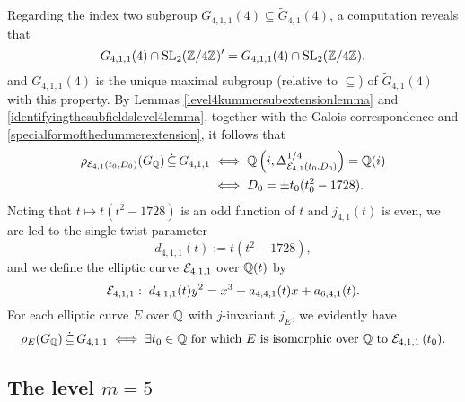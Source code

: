Regarding the index two subgroup $G_{4,1,1}(4) \subseteq \tilde{G}_{4,1}(4)$, a computation reveals that
\[
G_{4,1,1}(4) \cap \operatorname{SL}_2(\mathbb{Z}/4\mathbb{Z})' = G_{4,1,1}(4) \cap \operatorname{SL}_2(\mathbb{Z}/4\mathbb{Z}),
\]
and $G_{4,1,1}(4)$ is the unique maximal subgroup (relative to $\dot\subseteq$) of $\tilde{G}_{4,1}(4)$ with this property. By Lemmas \ref{level4kummersubextensionlemma} and \ref{identifyingthesubfieldslevel4lemma}, together with the Galois correspondence and \eqref{specialformofthedummerextension}, it follows that
\begin{equation} \label{howtogetsmallermod4image}
\begin{split}
\rho_{\mathcal{E}_{4,1}(t_0,D_0)}(G_{\mathbb{Q}}) \, \dot\subseteq \, G_{4,1,1} \; &\Longleftrightarrow \; \mathbb{Q}\left( i,\Delta_{\mathcal{E}_{4,1}(t_0,D_0)}^{1/4} \right) = \mathbb{Q}(i) \\
&\Longleftrightarrow \; D_0 = \pm t_0(t_0^2 - 1728).
\end{split}
\end{equation}
Noting that $t \mapsto t(t^2-1728)$ is an odd function of $t$ and $j_{4,1}(t)$ is even, we are led to the single twist parameter
\[
d_{4,1,1}(t) := t(t^2-1728),
\]
and we define the elliptic curve $\mathcal{E}_{4,1,1}$ over $\mathbb{Q}(t)$ by
\[
\mathcal{E}_{4,1,1} : \; d_{4,1,1}(t) y^2 = x^3 + a_{4;4,1}(t) x + a_{6;4,1}(t).
\]
For each elliptic curve $E$ over $\mathbb{Q}$ with $j$-invariant $j_E$, we evidently have
\[
\rho_{E}(G_{\mathbb{Q}}) \, \dot\subseteq \, G_{4,1,1} \; \Longleftrightarrow \; \exists t_0 \in \mathbb{Q} \text{ for which $E$ is isomorphic over $\mathbb{Q}$ to $\mathcal{E}_{4,1,1}\left( t_0 \right)$.}
\]

\medskip

\subsection{The level \texorpdfstring{$m=5$}.}


